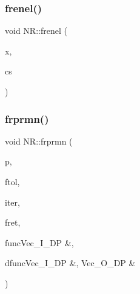 \mbox{\label{namespaceNR_ab068dc64940f5a4907725be35225d5c2}} 
\subsubsection{\texorpdfstring{frenel()}{frenel()}}
{\footnotesize\ttfamily void N\+R\+::frenel (\begin{DoxyParamCaption}\item[{const \mbox{\hyperlink{namespaceNR_af6ff762dd605ff477b8e52387253a02a}{DP}}}]{x,  }\item[{std\+::complex$<$ \mbox{\hyperlink{namespaceNR_af6ff762dd605ff477b8e52387253a02a}{DP}} $>$ \&}]{cs }\end{DoxyParamCaption})}

\mbox{\label{namespaceNR_a26147c3205dc588fd085cea57df864fe}} 
\subsubsection{\texorpdfstring{frprmn()}{frprmn()}}
{\footnotesize\ttfamily void N\+R\+::frprmn (\begin{DoxyParamCaption}\item[{\mbox{\hyperlink{namespaceNR_ab293e06a6bf799d8a7ed932b6852bcb8}{Vec\+\_\+\+I\+O\+\_\+\+DP}} \&}]{p,  }\item[{const \mbox{\hyperlink{namespaceNR_af6ff762dd605ff477b8e52387253a02a}{DP}}}]{ftol,  }\item[{int \&}]{iter,  }\item[{\mbox{\hyperlink{namespaceNR_af6ff762dd605ff477b8e52387253a02a}{DP}} \&}]{fret,  }\item[{\mbox{\hyperlink{namespaceNR_af6ff762dd605ff477b8e52387253a02a}{DP}} }]{funcVec\+\_\+\+I\+\_\+\+D\+P \&,  }\item[{void }]{dfuncVec\+\_\+\+I\+\_\+\+D\+P \&, Vec\+\_\+\+O\+\_\+\+D\+P \& }\end{DoxyParamCaption})}

\mbox{\label{namespaceNR_a4918e1edb5dcbabd728e268dc1502a6e}} 

